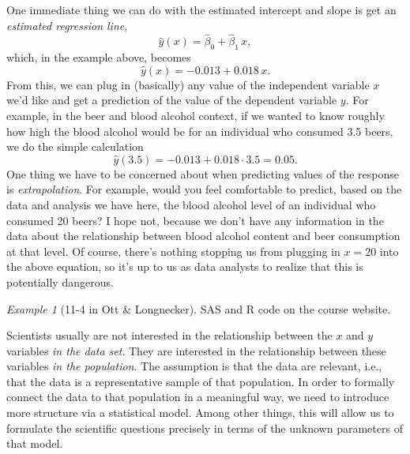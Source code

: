 \documentclass[a4paper, 12pt]{article}
\theoremstyle{plain}
\theoremstyle{definition}
\theoremstyle{remark}
\newtheorem*{example}{Example}
\begin{document}
One immediate thing we can do with the estimated intercept and slope is get an {\em estimated regression line}, 
\[ \hat y(x) = \hat\beta_0 + \hat\beta_1 \, x, \]
which, in the example above, becomes 
\[ \hat y(x) = -0.013 + 0.018 \, x. \]
From this, we can plug in (basically) any value of the independent variable $x$ we'd like and get a prediction of the value of the dependent variable $y$.  For example, in the beer and blood alcohol context, if we wanted to know roughly how high the blood alcohol would be for an individual who consumed 3.5 beers, we do the simple calculation
\[ \hat y(3.5) = -0.013 + 0.018 \cdot 3.5 = 0.05. \]
One thing we have to be concerned about when predicting values of the response is {\em extrapolation}.  For example, would you feel comfortable to predict, based on the data and analysis we have here, the blood alcohol level of an individual who consumed 20 beers?  I hope not, because we don't have any information in the data about the relationship between blood alcohol content and beer consumption at that level.  Of course, there's nothing stopping us from plugging in $x=20$ into the above equation, so it's up to us as data analysts to realize that this is potentially dangerous.  

\begin{example}[11-4 in Ott \& Longnecker] 
SAS and R code on the course website. 
\end{example}

Scientists usually are not interested in the relationship between the $x$ and $y$ variables {\em in the data set}.  They are interested in the relationship between these variables {\em in the population}.  The assumption is that the data are relevant, i.e., that the data is a representative sample of that population.  In order to formally connect the data to that population in a meaningful way, we need to introduce more structure via a statistical model.  Among other things, this will allow us to formulate the scientific questions precisely in terms of the unknown parameters of that model.  
\end{document}

